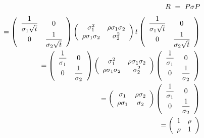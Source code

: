 \documentclass[uplatex,a4j,12pt,dvipdfmx]{jsarticle}
\begin{document}
\begin{eqnarray*}
	&& \hspace{-10mm}
	R \ = \ P \mathbb{\sigma} P
	\\[1mm] && \hspace{-20mm} \ =
	\left(
	\begin{array}{cc}
			\dfrac{1}{\sigma_{1} \sqrt{t}} & 0
			\\
			0                              & \dfrac{1}{\sigma_{2} \sqrt{t}}
		\end{array}
	\right)
	\left(
	\begin{array}{cc}
			\sigma_{1}^{2}             & \rho \sigma_{1} \sigma_{2}
			\\
			\rho \sigma_{1} \sigma_{2} & \sigma^{2}_{2}
		\end{array}
	\right)
	t
	\left(
	\begin{array}{cc}
			\dfrac{1}{\sigma_{1} \sqrt{t}} & 0
			\\
			0                              & \dfrac{1}{\sigma_{2} \sqrt{t}}
		\end{array}
	\right)
	\\ && \hspace{-20mm} \ =
	\left(
	\begin{array}{cc}
			\dfrac{1}{\sigma_{1}} & 0
			\\
			0                     & \dfrac{1}{\sigma_{2}}
		\end{array}
	\right)
	\left(
	\begin{array}{cc}
			\sigma_{1}^{2}             & \rho \sigma_{1} \sigma_{2}
			\\
			\rho \sigma_{1} \sigma_{2} & \sigma^{2}_{2}
		\end{array}
	\right)
	\left(
	\begin{array}{cc}
			\dfrac{1}{\sigma_{1}} & 0
			\\
			0                     & \dfrac{1}{\sigma_{2}}
		\end{array}
	\right)
	\\ && \hspace{-20mm} \ =
	\left(
	\begin{array}{cc}
			\sigma_{1}      & \rho \sigma_{2}
			\\
			\rho \sigma_{1} & \sigma_{2}
		\end{array}
	\right)
	\left(
	\begin{array}{cc}
			\dfrac{1}{\sigma_{1}} & 0
			\\
			0                     & \dfrac{1}{\sigma_{2}}
		\end{array}
	\right)
	\\ && \hspace{-20mm} \ =
	\left(
	\begin{array}{cc}
			1    & \rho
			\\
			\rho & 1
		\end{array}
	\right)
\end{eqnarray*}
%
%
\end{document}
